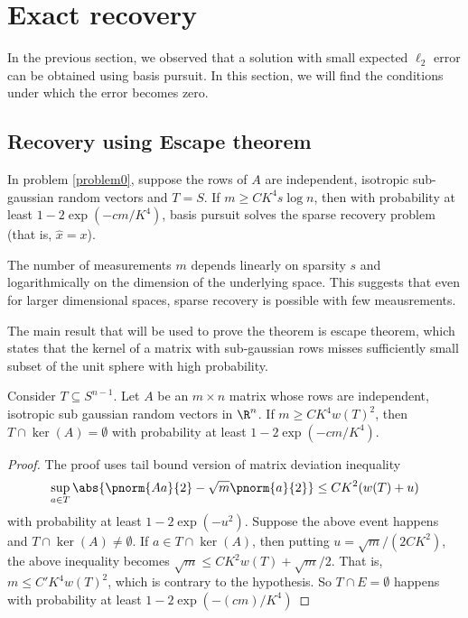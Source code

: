 \section{Exact recovery}

In the previous section, we observed that
a solution with small expected $\ell_2$ error can be obtained
using basis pursuit. In this section, we will
find the conditions under which the error becomes
zero.
\subsection{Recovery using Escape theorem}
\begin{theorem}\label{exactrecoverytheorem}
	In problem \eqref{problem0}, suppose the rows of $A$ are
	independent, isotropic sub-gaussian random vectors and
	$T = S$. If $m\geq CK^4 s\log n$, then with
	probability at least $1-2\exp(-cm/K^4)$,
	basis pursuit solves the sparse recovery problem
	(that is, $\hat{x} = x$).
	\end{theorem}
\begin{remark}
	The number of measurements $m$ depends linearly on
	sparsity $s$ and logarithmically on the dimension of
	the underlying space. This suggests that even for larger
	dimensional spaces, sparse recovery is possible with
	few meausrements.
\end{remark}
The main result that will be used to prove the theorem
is escape theorem, which states that the kernel of a matrix
with sub-gaussian rows misses sufficiently small subset of the unit sphere
with high probability.

\begin{theorem}\label{escapetheorem}
	Consider $T\subseteq S^{n-1}$. Let $A$ be an $m\times n$
	matrix whose rows are independent, isotropic sub gaussian
	random vectors in $\R^n$. If
	$m\geq CK^4w(T)^2$, then 
	$T\cap \ker(A) = \emptyset$ with probability at least
	$1-2\exp(-cm/K^4)$.
\end{theorem}
\begin{proof}
	The proof uses tail bound version of matrix deviation inequality
	$$\sup_{a\in T}\abs{\pnorm{Aa}{2}-\sqrt{m}\pnorm{a}{2}}
		\leq CK^2(w(T)+u)$$
	with probability at least $1-2\exp(-u^2)$.
	Suppose the above event happens and $T\cap\ker(A)\neq\emptyset$.
	If $a\in T\cap\ker(A)$, then putting $u = \sqrt{m}/(2CK^2)$,
	the above
	inequality becomes $\sqrt{m}\leq CK^2w(T) + \sqrt{m}/2$. That is,
	$m \leq C'K^4w(T)^2$, which is contrary to the hypothesis. So
	$T\cap E = \emptyset$ happens with probability at least $1-2\exp(-(cm)/K^4)$
\end{proof}

